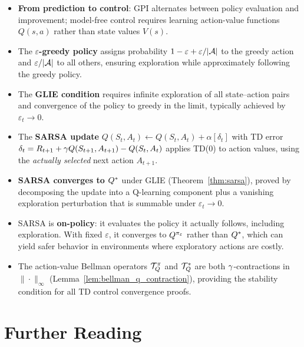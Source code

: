 \documentclass[11pt,a4paper]{article}
\begin{document}
\begin{itemize}
  \item \textbf{From prediction to control}: GPI alternates between
    policy evaluation and improvement; model-free control requires
    learning action-value functions $Q(s,a)$ rather than state values
    $V(s)$.

  \item The \textbf{$\varepsilon$-greedy policy} assigns probability
    $1 - \varepsilon + \varepsilon/|\mathcal{A}|$ to the greedy action
    and $\varepsilon/|\mathcal{A}|$ to all others, ensuring exploration
    while approximately following the greedy policy.

  \item The \textbf{GLIE condition} requires infinite exploration of
    all state--action pairs and convergence of the policy to greedy
    in the limit, typically achieved by $\varepsilon_t \to 0$.

  \item The \textbf{SARSA update}
    $Q(S_t,A_t) \leftarrow Q(S_t,A_t) + \alpha[\delta_t]$ with
    TD error $\delta_t = R_{t+1} + \gamma Q(S_{t+1}, A_{t+1})
    - Q(S_t, A_t)$ applies TD(0) to action values, using the
    \emph{actually selected} next action $A_{t+1}$.

  \item \textbf{SARSA converges to $Q^*$} under GLIE
    (Theorem~\ref{thm:sarsa}), proved by decomposing the update
    into a Q-learning component plus a vanishing exploration
    perturbation that is summable under $\varepsilon_t \to 0$.

  \item SARSA is \textbf{on-policy}: it evaluates the policy it
    actually follows, including exploration. With fixed
    $\varepsilon$, it converges to $Q^{\pi_\varepsilon}$
    rather than $Q^*$, which can yield safer behavior in
    environments where exploratory actions are costly.

  \item The action-value Bellman operators
    $\mathcal{T}^\pi_Q$ and $\mathcal{T}^*_Q$ are both
    $\gamma$-contractions in $\|\cdot\|_\infty$
    (Lemma~\ref{lem:bellman_q_contraction}), providing the stability
    condition for all TD control convergence proofs.
\end{itemize}

\section{Further Reading}
\label{sec:further_reading}
\end{document}
